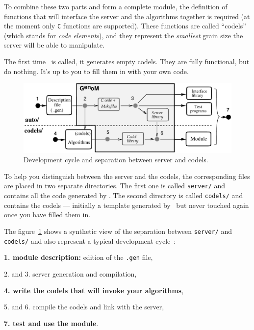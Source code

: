 To combine these two parts and form  a complete module, the definition of
functions that  will interface the server and  the algorithms together is
required (at the moment  only {\tt  C}  functions are  supported).  These
functions are  called ``codels'' (which  stands for {\em code elements}),
and they represent the {\em smallest} grain size  the server will be able
to manipulate.

The first  time \GenoM\  is called,  it generates empty  codels. They are
fully  functional, but do  nothing. It's up to  you to fill  them in with
your own code.

\bigbreak

\begin{figure}[htbp]
\centering
\includegraphics[width=0.8\hsize]{fig/cycle-en}
\caption{Development cycle and separation between server and codels.}
\label{fig|session|cycle}
\end{figure}

To help   you distinguish  between   the  server   and the   codels,  the
corresponding files are placed in two separate directories. The first one
is called {\tt server/} and contains all  the code generated by \GenoM. The
second directory is called {\tt   codels/} and  contains the codels   ---
initially a template generated by \GenoM\ but never touched again once
you have filled them in.

\bigbreak

The figure~\ref{fig|session|cycle} shows a synthetic view of the
separation between {\tt server/} and {\tt codels/} and also represent a
typical development cycle~:

\begin{description}
   \item{\bf 1. module description:} edition of the {\tt .gen} file,
   \item{2. and 3. server generation and compilation},
   \item{\bf 4. write the codels that will invoke your algorithms},
   \item{5. and 6. compile the codels and link with the server},
   \item{\bf 7. test and use the module}.
\end{description}

